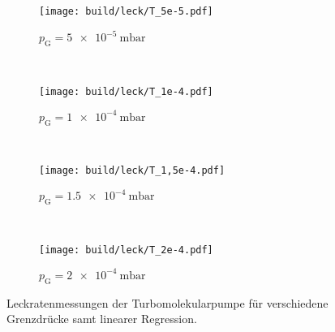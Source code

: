 \begin{figure}
  \centering
  \begin{subfigure}[b]{0.48\textwidth}
    \texttt{[image: build/leck/T\_5e-5.pdf]}
    \caption{$p_\text{G} = \SI{5e-5}{\milli\bar}$}
  \end{subfigure}
  ~ %
  \begin{subfigure}[b]{0.48\textwidth}
    \texttt{[image: build/leck/T\_1e-4.pdf]}
    \caption{$p_\text{G} = \SI{1e-4}{\milli\bar}$}
  \end{subfigure}
  \\
  \begin{subfigure}[b]{0.48\textwidth}
    \texttt{[image: build/leck/T\_1,5e-4.pdf]}
    \caption{$p_\text{G} = \SI{1,5e-4}{\milli\bar}$}
  \end{subfigure}
  ~ %
  \begin{subfigure}[b]{0.48\textwidth}
    \texttt{[image: build/leck/T\_2e-4.pdf]}
    \caption{$p_\text{G} = \SI{2e-4}{\milli\bar}$}
  \end{subfigure}
  \caption{Leckratenmessungen der Turbomolekularpumpe für verschiedene Grenzdrücke samt linearer Regression.}
  \label{fig:leck_T}
\end{figure}


\FloatBarrier
